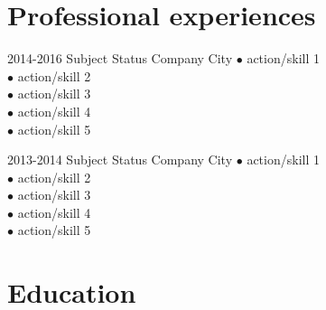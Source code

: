\documentclass[]{friggeri-cv}
\begin{document}

	\section{\faBriefcase\space Professional experiences}

		\begin{entrylist}


			\Experience
			{2014-2016}
			{Subject}
			{Status}
			{Company}
			{City}
			{$\bullet$ action/skill 1\\
			$\bullet$ action/skill 2\\
			$\bullet$ action/skill 3\\
			$\bullet$ action/skill 4\\
			$\bullet$ action/skill 5\\}


			\Experience
			{2013-2014}
			{Subject}
			{Status}
			{Company}
			{City}
			{$\bullet$ action/skill 1\\
			$\bullet$ action/skill 2\\
			$\bullet$ action/skill 3\\
			$\bullet$ action/skill 4\\
			$\bullet$ action/skill 5\\}


		\end{entrylist}


	\section{\faBook\space Education}
\end{document}

